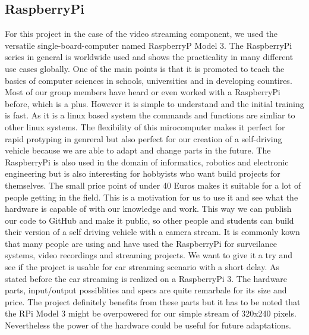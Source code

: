 \documentclass[conference]{IEEEtran}
\begin{document}
\subsection{RaspberryPi}
For this project in the case of the video streaming component, we used the versatile single-board-computer named RaspberryP Model 3. The RaspberryPi series in general is worldwide used and shows the practicality in many different use cases globally. One of the main points is that it is promoted to teach the basics of computer sciences in schools, universities and in developing countires. Most of our group members have heard or even worked with a RaspberryPi before, which is a plus. However it is simple to understand and the initial training is fast. As it is a linux based system the commands and functions are simliar to other linux systems. The flexibility of this mirocomputer makes it perfect for rapid protyping in genreral but also perfect for our creation of a self-driving vehicle because we are able to adapt and change parts in the future. The RaspberryPi is also used in the domain of informatics, robotics and electronic engineering but is also interesting for hobbyists who want build projects for themselves. The small price point of under 40 Euros makes it suitable for a lot of people getting in the field. This is a motivation for us to use it and see what the hardware is capable of with our knowledge and work. This way we can publish our code to GitHub and make it public, so other people and students can build their version of a self driving vehicle with a camera stream. It is commonly kown that many people are using and have used the RaspberryPi for surveilance systems, video recordings and streaming projects. We want to give it a try and see if the project is usable for car streaming scenario with a short delay.
\newline
As stated before the car streaming is realized on a RaspberryPi 3. The hardware parts, input/output possiblities and specs are quite remarbale for its size and price. The project definitely benefits from these parts but it has to be noted that the RPi Model 3 might be overpowered for our simple stream of 320x240 pixels. Nevertheless the power of the hardware could be useful for future adaptations. 
\end{document}
